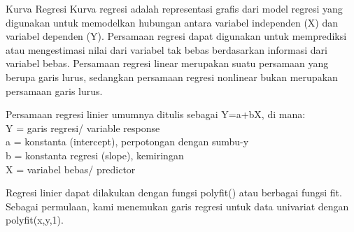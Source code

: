 \documentclass[a4paper,10pt]{article}
\begin{document}
\begin{eulernotebook}
\begin{eulercomment}
\begin{eulercomment}
\begin{eulercomment}
\begin{eulercomment}
\begin{eulercomment}
\begin{eulercomment}
\begin{eulercomment}
\begin{eulercomment}
\begin{eulercomment}
\begin{eulercomment}
\begin{eulercomment}
\begin{eulercomment}
\begin{eulercomment}
\begin{eulercomment}
\begin{eulercomment}
\begin{eulercomment}
\begin{eulercomment}
\begin{eulercomment}
\begin{eulercomment}
\end{eulercomment}
\eulersubheading{}
\begin{eulercomment}
Kurva Regresi 
Kurva regresi adalah representasi grafis dari model regresi yang
digunakan untuk memodelkan hubungan antara variabel independen (X) dan
variabel dependen (Y). Persamaan regresi dapat digunakan untuk
memprediksi atau mengestimasi nilai dari variabel tak bebas
berdasarkan informasi dari variabel bebas. Persamaan regresi linear
merupakan suatu persamaan yang berupa garis lurus, sedangkan persamaan
regresi nonlinear bukan merupakan persamaan garis lurus.

Persamaan regresi linier umumnya ditulis sebagai Y=a+bX, di mana: \\
Y = garis regresi/ variable response\\
a = konstanta (intercept), perpotongan dengan sumbu-y\\
b = konstanta regresi (slope), kemiringan\\
X = variabel bebas/ predictor

Regresi linier dapat dilakukan dengan fungsi polyfit() atau berbagai
fungsi fit. Sebagai permulaan, kami menemukan garis regresi untuk data
univariat dengan polyfit(x,y,1).


\end{eulercomment}
\end{eulercomment}
\end{eulercomment}
\end{eulercomment}
\end{eulercomment}
\end{eulercomment}
\end{eulercomment}
\end{eulercomment}
\end{eulercomment}
\end{eulercomment}
\end{eulercomment}
\end{eulercomment}
\end{eulercomment}
\end{eulercomment}
\end{eulercomment}
\end{eulercomment}
\end{eulercomment}
\end{eulercomment}
\end{eulercomment}
\end{eulernotebook}
\end{document}

